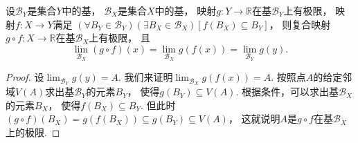 \begin{theorem}
设\(\mathcal{B}_Y\)是集合\(Y\)中的基，
\(\mathcal{B}_X\)是集合\(X\)中的基，
映射\(g\colon Y\to\mathbb{R}\)在基\(\mathcal{B}_Y\)上有极限，
映射\(f\colon X\to Y\)满足
\((\forall B_Y\in\mathcal{B}_Y)
(\exists B_X\in\mathcal{B}_X)
[f(B_X) \subseteq B_Y]\)，
则复合映射\(g \circ f\colon X\to\mathbb{R}\)在基\(\mathcal{B}_X\)上有极限，
且\[
	\lim_{\mathcal{B}_X} (g \circ f)(x)
	= \lim_{\mathcal{B}_X} g(f(x))
	= \lim_{\mathcal{B}_Y} g(y).
\]
\begin{proof}
设\(\lim_{\mathcal{B}_Y} g(y) = A\).
我们来证明\(\lim_{\mathcal{B}_X} g(f(x)) = A\).
按照点\(A\)的给定邻域\(V(A)\)求出基\(\mathcal{B}_Y\)的元素\(B_Y\)，
使得\(g(B_Y) \subseteq V(A)\).
根据条件，可以求出基\(\mathcal{B}_X\)的元素\(B_X\)，
使得\(f(B_X) \subseteq B_Y\).
但此时\((g \circ f)(B_X) = g(f(B_X)) \subseteq g(B_Y) \subseteq V(A)\)，
这就说明\(A\)是\(g \circ f\)在基\(\mathcal{B}_X\)上的极限.
\end{proof}
\end{theorem}
